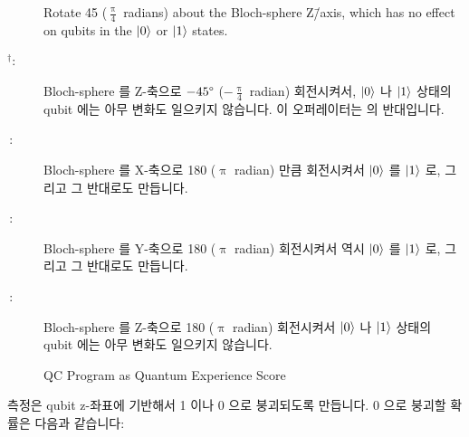 \begin{description}
	Rotate 45\degree{} ($\frac{\uppi}{4}$ radians) about the
	Bloch-sphere Z\=/axis, which has no effect on qubits in the
	$\ket{0}$ or $\ket{1}$ states.
	\fi
\item[\qop{T}$^{\bm{\dagger}}$:]
	Bloch-sphere 를 Z-축으로 $-45\degree{}$ ($-\frac{\uppi}{4}$ radian)
	회전시켜서, $\ket{0}$ 나 $\ket{1}$ 상태의 qubit 에는 아무 변화도
	일으키지 않습니다.
	이 오퍼레이터는  의 반대입니다.

\item[\qop{X}\,:]
	Bloch-sphere 를 X-축으로 180\degree{} ($\uppi$ radian) 만큼 회전시켜서
	$\ket{0}$ 를 $\ket{1}$ 로, 그리고 그 반대로도 만듭니다.

\item[\qop{Y}\,:]
	Bloch-sphere 를 Y-축으로 180\degree{} ($\uppi$ radian) 회전시켜서 역시
	$\ket{0}$ 를 $\ket{1}$ 로, 그리고 그 반대로도 만듭니다.

\item[\qop{Z}\,:]
	Bloch-sphere 를 Z-축으로 180\degree{} ($\uppi$ radian) 회전시켜서
	$\ket{0}$ 나 $\ket{1}$ 상태의 qubit 에는 아무 변화도 일으키지 않습니다.

\end{description}

\begin{figure}[tb]
\centering
{}
\caption{QC Program as Quantum Experience Score}
\label{fig:future:QC Program as Quantum Experience Score}
\end{figure}

측정은 qubit z-좌표에 기반해서 1 이나 0 으로 붕괴되도록 만듭니다.
0 으로 붕괴할 확률은 다음과 같습니다:


